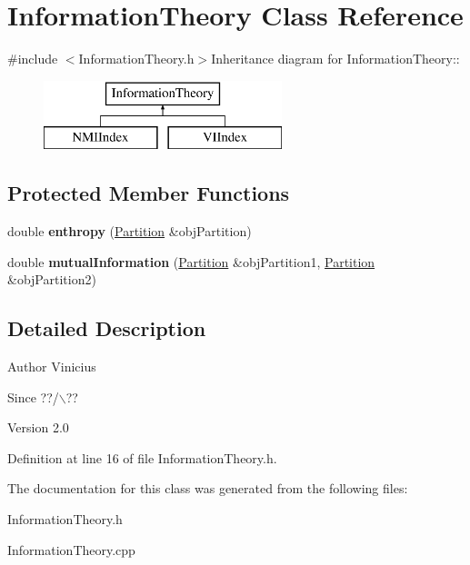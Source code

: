 \hypertarget{classInformationTheory}{
\section{InformationTheory Class Reference}
\label{classInformationTheory}
}


{\ttfamily \#include $<$InformationTheory.h$>$}Inheritance diagram for InformationTheory::\begin{figure}[H]
\begin{center}
\leavevmode
\includegraphics[height=2cm]{classInformationTheory}
\end{center}
\end{figure}
\subsection*{Protected Member Functions}
\begin{DoxyCompactItemize}
\item 
\hypertarget{classInformationTheory_ab9f75d2afd8a139f17f09c4e5ceb1019}{
double {\bfseries enthropy} (\hyperlink{classPartition}{Partition} \&objPartition)}
\label{classInformationTheory_ab9f75d2afd8a139f17f09c4e5ceb1019}

\item 
\hypertarget{classInformationTheory_a169e8d286d0b4333dfce9e54d1dcd703}{
double {\bfseries mutualInformation} (\hyperlink{classPartition}{Partition} \&objPartition1, \hyperlink{classPartition}{Partition} \&objPartition2)}
\label{classInformationTheory_a169e8d286d0b4333dfce9e54d1dcd703}

\end{DoxyCompactItemize}


\subsection{Detailed Description}
\begin{DoxyAuthor}{Author}
Vinicius 
\end{DoxyAuthor}
\begin{DoxySince}{Since}
??/$\backslash$?? 
\end{DoxySince}
\begin{DoxyVersion}{Version}
2.0 
\end{DoxyVersion}


Definition at line 16 of file InformationTheory.h.

The documentation for this class was generated from the following files:\begin{DoxyCompactItemize}
\item 
InformationTheory.h\item 
InformationTheory.cpp\end{DoxyCompactItemize}
